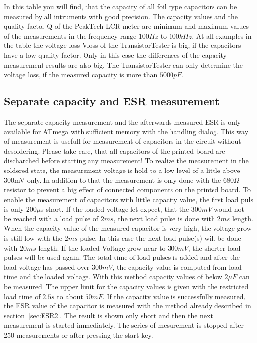 In this table you will find, that the capacity of all foil type capacitors can be measured by all intruments
with good precision.
The capacity values and the quality factor Q of the PeakTech LCR meter are minimum and maximum values of the
measurements in the frequency range \(100 Hz\) to \(100 kHz\).
At all examples in the table the voltage loss Vloss of the TransistorTester is big,
if the capacitors have a low quality factor.
Only in this case the differences of the capacity measurement results are also big.
The TransistorTester can only determine the voltage loss, if the measured capacity is more than \(5000 pF\).

\subsection{Separate capacity and ESR measurement}
The separate capacity measurement and the afterwards measured ESR is only available for ATmega with sufficient 
memory with the handling dialog. This way of measurement is usefull for measurement of capacitors in the
circuit without desoldering.
Please take care, that all capacitors of the printed board are discharched before starting any measurement!
To realize the measurement in the soldered state, the measurement voltage is hold
to a low level of a little above 300mV only.
In addition to that the measurement is only done with the \(680 \Omega\) resistor to prevent a
big effect of connected components on the printed board.
To enable the measurement of capacitors with little capacity value, the first load puls is only
\(200 \mu s\) short. If the loaded voltage let expect, that the \(300 mV\) would not be reached with
a load pulse of \(2 ms\), the next load pulse is done with \(2 ms\) length.
When the capacity value of the measured capacitor is very high, the voltage grow is still low
with the \(2 ms\) pulse. In this case the next load pulse(s) will be done with \(20 ms\) length.
If the loaded Voltage grow near to \(300mV\), the shorter load pulses will be used again.
The total time of load pulses is added and after the load voltage has passed over \(300 mV\), the
capacity value is computed from load time and the loaded voltage.
With this method capacity values of below \(2 \mu F\) can be measured. The upper limit for the capacity
values is given with the restricted load time of \(2.5 s\) to about \(50 mF\).
If the capacity value is successfully measured, the ESR value of the capacitor is measured with the
method already described in section~\ref{sec:ESR2}.
The result is shown only short and then the next measurement is started immediately.
The series of mesurement is stopped after 250 measurements or after pressing the start key.



